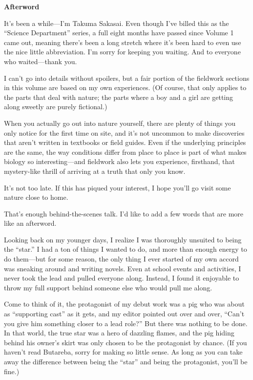 \documentclass[
    a4paper,
    12pt,
    twoside,
    openany,
    UTF8,
    fontset=windows
]{ctexbook}
\begin{document}
\clearpage
\thispagestyle{plain}
\begin{center}
    \large\bfseries
    Afterword
\end{center}
\label{sec:afterwordV2}
\vspace{1cm}

It's been a while---I'm Takuma Sakasai. Even though I've billed this as the ``Science Department'' series, a full eight months have passed since Volume 1 came out, meaning there's been a long stretch where it's been hard to even use the nice little abbreviation. I'm sorry for keeping you waiting. And to everyone who waited---thank you.

I can't go into details without spoilers, but a fair portion of the fieldwork sections in this volume are based on my own experiences. (Of course, that only applies to the parts that deal with nature; the parts where a boy and a girl are getting along sweetly are purely fictional.)

When you actually go out into nature yourself, there are plenty of things you only notice for the first time on site, and it's not uncommon to make discoveries that aren't written in textbooks or field guides. Even if the underlying principles are the same, the way conditions differ from place to place is part of what makes biology so interesting---and fieldwork also lets you experience, firsthand, that mystery-like thrill of arriving at a truth that only you know.

It's not too late. If this has piqued your interest, I hope you'll go visit some nature close to home.

That's enough behind-the-scenes talk. I'd like to add a few words that are more like an afterword.

Looking back on my younger days, I realize I was thoroughly unsuited to being the ``star.'' I had a ton of things I wanted to do, and more than enough energy to do them---but for some reason, the only thing I ever started of my own accord was sneaking around and writing novels. Even at school events and activities, I never took the lead and pulled everyone along. Instead, I found it enjoyable to throw my full support behind someone else who would pull me along.

Come to think of it, the protagonist of my debut work was a pig who was about as ``supporting cast'' as it gets, and my editor pointed out over and over, ``Can't you give him something closer to a lead role?'' But there was nothing to be done. In that world, the true star was a hero of dazzling flames, and the pig hiding behind his owner's skirt was only chosen to be the protagonist by chance. (If you haven't read Butareba, sorry for making so little sense. As long as you can take away the difference between being the ``star'' and being the protagonist, you'll be fine.)
\end{document}

